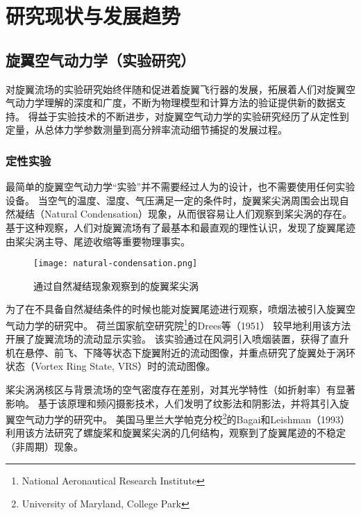 \documentclass[doctor,openright,twoside,color]{buaathesis}
\begin{document}
\chapter{研究现状与发展趋势}

\section{旋翼空气动力学（实验研究）}
对旋翼流场的实验研究始终伴随和促进着旋翼飞行器的发展，拓展着人们对旋翼空气动力学理解的深度和广度，不断为物理模型和计算方法的验证提供新的数据支持。
得益于实验技术的不断进步，对旋翼空气动力学的实验研究经历了从定性到定量，从总体力学参数测量到高分辨率流动细节捕捉的发展过程。

\subsection{定性实验}
最简单的旋翼空气动力学“实验”并不需要经过人为的设计，也不需要使用任何实验设备。
当空气的温度、湿度、气压满足一定的条件时，旋翼桨尖涡周围会出现自然凝结（Natural Condensation）现象，从而很容易让人们观察到桨尖涡的存在。
基于这种观察，人们对旋翼流场有了最基本和最直观的理性认识，发现了旋翼尾迹由桨尖涡主导、尾迹收缩等重要物理事实。
\begin{figure}[h!]
  \centering
  \texttt{[image: natural-condensation.png]}\\
  \caption{通过自然凝结现象观察到的旋翼桨尖涡}
\end{figure}

为了在不具备自然凝结条件的时候也能对旋翼尾迹进行观察，喷烟法被引入旋翼空气动力学的研究中。
荷兰国家航空研究院\footnote{National Aeronautical Research Institute}的Drees等（1951）
较早地利用该方法开展了旋翼流场的流动显示实验。
该实验通过在风洞引入喷烟装置，获得了直升机在悬停、前飞、下降等状态下旋翼附近的流动图像，并重点研究了旋翼处于涡环状态（Vortex Ring State, VRS）时的流动图像。
\begin{figure}[t!]
\begin{floatrow}
\end{floatrow}
\end{figure}

桨尖涡涡核区与背景流场的空气密度存在差别，对其光学特性（如折射率）有显著影响。
基于该原理和频闪摄影技术，人们发明了纹影法和阴影法，并将其引入旋翼空气动力学的研究中。
美国马里兰大学帕克分校\footnote{University of Maryland, College Park}的Bagai和Leishman（1993）
利用该方法研究了螺旋桨和旋翼桨尖涡的几何结构，观察到了旋翼尾迹的不稳定（非周期）现象。
\end{document}
